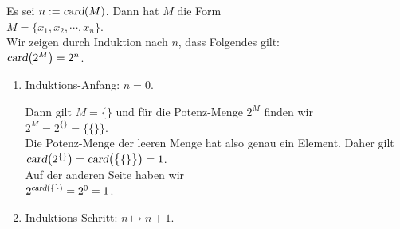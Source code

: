 \proof
Es sei $n := \textsl{card}(M)$.  Dann hat $M$ die Form
\\[0.2cm]
\hspace*{1.3cm}
$M = \{ x_1, x_2, \cdots, x_n \}$.
\\[0.2cm]
Wir zeigen durch Induktion nach $n$, dass Folgendes gilt:
\\[0.2cm]
\hspace*{1.3cm}
$\textsl{card}\bigl(2^M\bigr) = 2^n$.
\begin{enumerate}
\item Induktions-Anfang: $n = 0$.

      Dann gilt  $M = \{\}$ und f\"{u}r die Potenz-Menge $2^M$ finden wir
      \\[0.2cm]
      \hspace*{1.3cm}
      $2^M = 2^{\{\}} = \bigl\{ \{\} \bigr\}$.
      \\[0.2cm]
      Die Potenz-Menge der leeren Menge hat also genau ein Element.  Daher gilt
      \\[0.2cm]
      \hspace*{1.3cm}
      $\textsl{card}\bigl(2^{\{\}}\bigr) = \textsl{card}\bigl(\bigl\{ \{\} \bigr\}\bigr) = 1$.
      \\[0.2cm]
      Auf der anderen Seite haben wir 
      \\[0.2cm]
      \hspace*{1.3cm}
      $2^{\textsl{card}(\{\})} = 2^0 = 1$.
\item Induktions-Schritt: $n \mapsto n + 1$.


\end{enumerate}
